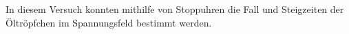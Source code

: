 In diesem Versuch konnten mithilfe von Stoppuhren die Fall und Steigzeiten der Öltröpfchen im Spannungsfeld bestimmt werden.
